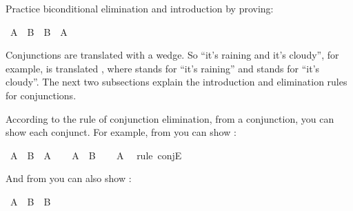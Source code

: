 \begin{isabellebody}
\begin{isamarkuptext}
\end{isamarkuptext}\isamarkuptrue%
%
\begin{isamarkuptext}%
\begin{Exercise} Practice biconditional elimination and introduction by proving: \end{Exercise}%
\end{isamarkuptext}\isamarkuptrue%
\isamarkupfalse%
\ {\isachardoublequoteopen}{\isacharparenleft}A\ {\isasymlongleftrightarrow}\ B{\isacharparenright}\ {\isasymlongleftrightarrow}\ {\isacharparenleft}B\ {\isasymlongleftrightarrow}\ A{\isacharparenright}{\isachardoublequoteclose}%
\isadelimproof
\ %
\endisadelimproof
%
\isatagproof
{}\isamarkupfalse%
%
\endisatagproof
{\isafoldproof}%
%
\isadelimproof
%
\endisadelimproof
%
\isamarkuptrue%
%
\begin{isamarkuptext}%
Conjunctions are translated with a wedge. So ``it's raining and it's cloudy'', for example,
is translated , where  stands for ``it's raining'' and  stands
for ``it's cloudy''. The next two subsections explain the introduction and elimination rules for
conjunctions.%
\end{isamarkuptext}\isamarkuptrue%
%
\isamarkuptrue%
%
\begin{isamarkuptext}%
According to the rule of conjunction elimination, from a conjunction, you can show each
conjunct. For example, from  you can show :%
\end{isamarkuptext}\isamarkuptrue%
\isamarkupfalse%
\ {\isachardoublequoteopen}A\ {\isasymand}\ B\ {\isasymlongrightarrow}\ A{\isachardoublequoteclose}\isanewline
%
\isadelimproof
%
\endisadelimproof
%
\isatagproof
{}\isamarkupfalse%
\isanewline
\ \ \isamarkupfalse%
\ {\isachardoublequoteopen}A\ {\isasymand}\ B{\isachardoublequoteclose}\isanewline
\ \ \isamarkupfalse%
\ {\isachardoublequoteopen}A{\isachardoublequoteclose}\ \isamarkupfalse%
\ {\isacharparenleft}rule\ conjE{\isacharparenright}\isanewline
{}\isamarkupfalse%
%
\endisatagproof
{\isafoldproof}%
%
\isadelimproof
%
\endisadelimproof
%
\begin{isamarkuptext}%
And from  you can also show :%
\end{isamarkuptext}\isamarkuptrue%
\isamarkupfalse%
\ {\isachardoublequoteopen}A\ {\isasymand}\ B\ {\isasymlongrightarrow}\ B{\isachardoublequoteclose}\isanewline

\end{isabellebody}
